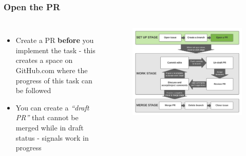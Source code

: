\documentclass[aspectratio=169]{beamer} %
\begin{document}
\begin{frame}
	\frametitle{Open the PR}
	\begin{columns}[c]

		\begin{itemize}
			\setlength\itemsep{1em}
			\item Create a PR \textbf{before} you implement the task
			- this creates a space on GitHub.com
			where the progress of this task can be followed
			\item You can create a \textit{``draft PR''} 
			that cannot be merged while in draft status
			- signals work in progress
		\end{itemize}

		\vspace{-.75cm}
		\begin{figure}
			\centering
			\includegraphics[width=\textwidth]{./img/branch-pr-merge-cycle-S1-3.png}
		\end{figure}

	\end{columns}
\end{frame}
\end{document}
